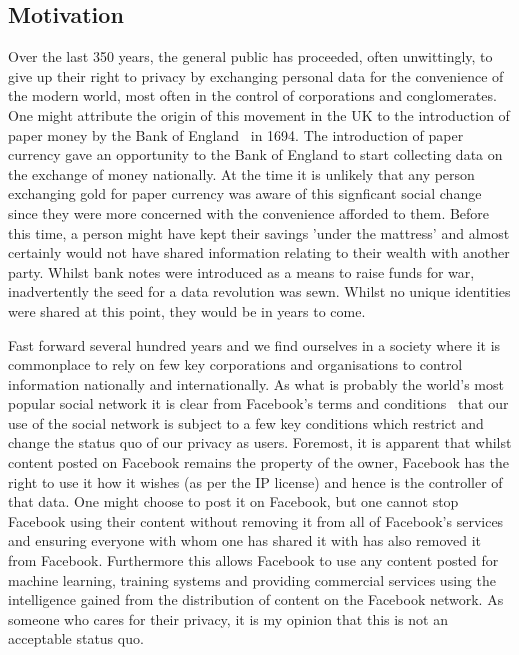 \subsection{Motivation}

Over the last 350 years, the general public has proceeded, often unwittingly, to give up their right to privacy by exchanging personal data for the convenience of the modern world, most often in the control of corporations and conglomerates.
\newline
One might attribute the origin of this movement in the UK to the introduction of paper money by the Bank of England~\parencite{bankofengland:2016:online} in 1694. The introduction of paper currency gave an opportunity to the Bank of England to start collecting data on the exchange of money nationally. At the time it is unlikely that any person exchanging gold for paper currency was aware of this signficant social change since they were more concerned with the convenience afforded to them. Before this time, a person might have kept their savings 'under the mattress' and almost certainly would not have shared information relating to their wealth with another party. Whilst bank notes were introduced as a means to raise funds for war, inadvertently the seed for a data revolution was sewn. Whilst no unique identities were shared at this point, they would be in years to come.

Fast forward several hundred years and we find ourselves in a society where it is commonplace to rely on few key corporations and organisations to control information nationally and internationally. As what is probably the world's most popular social network it is clear from Facebook's terms and conditions~\autocite{facebookterms:2015:online} that our use of the social network is subject to a few key conditions which restrict and change the status quo of our privacy as users. Foremost, it is apparent that whilst content posted on Facebook remains the property of the owner, Facebook has the right to use it how it wishes (as per the IP license) and hence is the controller of that data. One might choose to post it on Facebook, but one cannot stop Facebook using their content without removing it from all of Facebook's services and ensuring everyone with whom one has shared it with has also removed it from Facebook. Furthermore this allows Facebook to use any content posted for machine learning, training systems and providing commercial services using the intelligence gained from the distribution of content on the Facebook network. As someone who cares for their privacy, it is my opinion that this is not an acceptable status quo.

